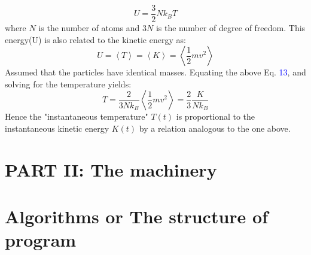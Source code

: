 \documentclass[a4paper]{article}
\begin{document}
\begin{equation}
U = \frac{3}{2}Nk_B T
\end{equation}
where $N$ is the number of atoms and $3N$ is the number of degree of freedom. This energy(U) is also related to the kinetic energy as:
\begin{equation}
U = \left< T \right > = \left< K \right > = \left< \frac{1}{2}mv^2 \right > 
\end{equation}
Assumed that the particles have identical masses. Equating the above Eq. \textcolor{blue}{13}, and solving for the temperature yields: 
\begin{equation}
T = \frac{2}{3N k_B}\left< \frac{1}{2} m v^2 \right > = \frac{2}{3}\frac{K}{N k_B}
\end{equation}
Hence the "instantaneous temperature" $T(t)$ is proportional to the instantaneous kinetic energy $K(t)$ by a relation analogous to the one above. 

\section*{PART II: The machinery}
\section{Algorithms or The structure of program}
\end{document}
